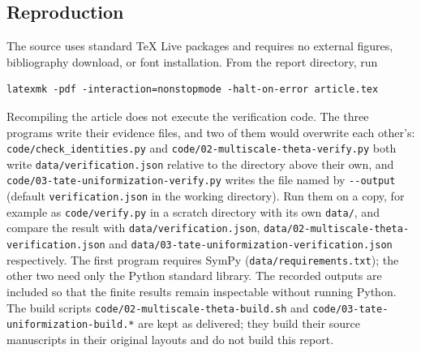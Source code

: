 \documentclass[11pt,letterpaper]{article}
\theoremstyle{definition}
\newcommand{\file}[1]{\nolinkurl{#1}}
\begin{document}
\subsection{Reproduction}\label{tate:app:reproduction}

The source uses standard TeX Live packages and requires no external
figures, bibliography download, or font installation. From the report
directory, run
\begin{verbatim}
latexmk -pdf -interaction=nonstopmode -halt-on-error article.tex
\end{verbatim}
Recompiling the article does not execute the verification code. The three
programs write their evidence files, and two of them would overwrite each
other's: \file{code/check_identities.py} and
\file{code/02-multiscale-theta-verify.py} both write
\file{data/verification.json} relative to the directory above their own,
and \file{code/03-tate-uniformization-verify.py} writes the file named by
\file{--output} (default \file{verification.json} in the working
directory). Run them on a copy, for example as \file{code/verify.py} in a
scratch directory with its own \file{data/}, and compare the result with
\file{data/verification.json}, \file{data/02-multiscale-theta-verification.json}
and \file{data/03-tate-uniformization-verification.json} respectively. The
first program requires SymPy (\file{data/requirements.txt}); the other two
need only the Python standard library. The recorded outputs are included so
that the finite results remain inspectable without running Python. The
build scripts \file{code/02-multiscale-theta-build.sh} and
\file{code/03-tate-uniformization-build.*} are kept as delivered; they build
their source manuscripts in their original layouts and do not build this
report.
\end{document}
